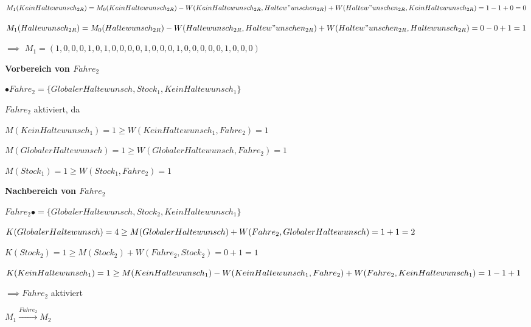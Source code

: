 \documentclass{scrreprt}
\begin{document}
\begin{enumerate}
\begin{addmargin}[1cm]{0cm}
  $M_1(KeinHaltewunsch_{2R}) = M_0(KeinHaltewunsch_{2R}) - \\ W(KeinHaltewunsch_{2R}, Haltew"unschen_{2R}) + \\ W(Haltew"unschen_{2R}, KeinHaltewunsch_{2R}) = 1 - 1 + 0 = 0$

  $M_1(Haltewunsch_{2R}) = M_0(Haltewunsch_{2R}) - \\ W(Haltewunsch_{2R}, Haltew"unschen_{2R}) + \\ W(Haltew"unschen_{2R}, Haltewunsch_{2R}) = 0 - 0 + 1 = 1$

  $\implies$ 
  $M_1 = (
  1, 0, 0, 0, 1, 
  0, 1, 0, 0, 0, 
  0, 1, 0, 0, 0, 
  1, 0, 0, 0, 0, 
  0, 1, 0, 0, 0
  )$
\end{addmargin}


\textbf{Vorbereich von $Fahre_2$}

\begin{addmargin}[1cm]{0cm}
  $\bullet Fahre_2 = \{ GlobalerHaltewunsch, Stock_1, KeinHaltewunsch_1 \}$

  $Fahre_2$ aktiviert, da

  $M(KeinHaltewunsch_1) = 1 \geq W(KeinHaltewunsch_1, Fahre_2) = 1$  

  $M(GlobalerHaltewunsch) = 1 \geq W(GlobalerHaltewunsch, Fahre_2) = 1$

  $M(Stock_1) = 1 \geq W(Stock_1, Fahre_2) = 1$
\end{addmargin}

\textbf{Nachbereich von $Fahre_2$}

\begin{addmargin}[1cm]{0cm}
  $Fahre_2 \bullet = \{ GlobalerHaltewunsch, Stock_2, KeinHaltewunsch_1 \}$

  $K(GlobalerHaltewunsch) = 4 \geq M(GlobalerHaltewunsch) + \\ W(Fahre_2, GlobalerHaltewunsch) = 1 + 1 = 2$ 

  $K(Stock_2) = 1 \geq M(Stock_2) + W(Fahre_2, Stock_2) = 0 + 1 = 1$

  $K(KeinHaltewunsch_1) = 1 \geq M(KeinHaltewunsch_1) - \\ W(KeinHaltewunsch_1, Fahre_2) + \\ W(Fahre_2, KeinHaltewunsch_1) = 1 - 1 + 1$

  $\implies Fahre_2$ aktiviert
\end{addmargin}


$M_1 \xrightarrow{Fahre_2} M_2$


\end{enumerate}
\end{document}
